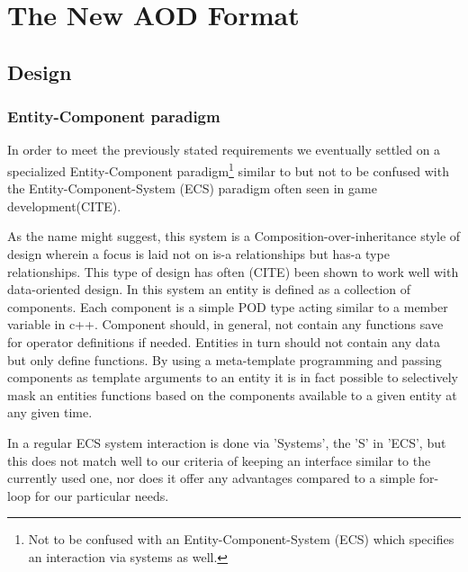 \documentclass[a4paper]{report}
\begin{document}
\chapter{The New AOD Format}

\section{Design}
\subsection{Entity-Component paradigm}
In order to meet the previously stated requirements we eventually settled on a specialized Entity-Component
paradigm\footnote{Not to be confused with an Entity-Component-System (ECS) which specifies an interaction via systems as well.}
similar to but not to be confused with the Entity-Component-System (ECS) paradigm often  seen in game development(CITE).
\par As the name might suggest, this system is a Composition-over-inheritance style of design wherein a focus is laid not on is-a relationships but
has-a type relationships. This type of design has often (CITE) been shown to work well with data-oriented design.
In this system an entity is defined as a collection of components. Each component is a simple POD type acting similar to a member variable in c++. Component should, in general,
not contain any functions save for operator definitions if needed. Entities in turn should not contain any data but only define functions. By using a meta-template programming and
passing components as template arguments to an entity it is in fact possible to selectively mask an entities functions based on the components available to a given entity at any given time.
\par In a regular ECS system interaction is done via 'Systems', the 'S' in 'ECS', but this does not match well to our criteria of keeping an interface similar to the currently
used one, nor does it offer any advantages compared to a simple for-loop for our particular needs.
\end{document}
